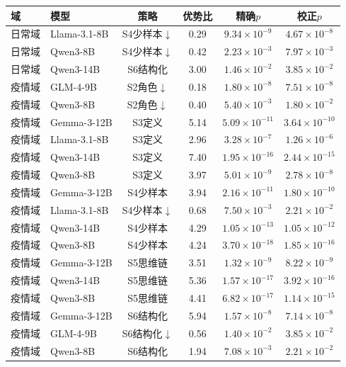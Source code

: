 \begin{tabular}{llcccc}
\toprule
域 & 模型 & 策略 & 优势比 & 精确$p$ & 校正$p$ \\
\midrule
日常域 & Llama-3.1-8B & S4少样本$\downarrow$ & 0.29 & $9.34\times 10^{-9}$ & $4.67\times 10^{-8}$ \\
日常域 & Qwen3-8B & S4少样本$\downarrow$ & 0.42 & $2.23\times 10^{-3}$ & $7.97\times 10^{-3}$ \\
日常域 & Qwen3-14B & S6结构化 & 3.00 & $1.46\times 10^{-2}$ & $3.85\times 10^{-2}$ \\
疫情域 & GLM-4-9B & S2角色$\downarrow$ & 0.18 & $1.80\times 10^{-8}$ & $7.51\times 10^{-8}$ \\
疫情域 & Qwen3-8B & S2角色$\downarrow$ & 0.40 & $5.40\times 10^{-3}$ & $1.80\times 10^{-2}$ \\
疫情域 & Gemma-3-12B & S3定义 & 5.14 & $5.09\times 10^{-11}$ & $3.64\times 10^{-10}$ \\
疫情域 & Llama-3.1-8B & S3定义 & 2.96 & $3.28\times 10^{-7}$ & $1.26\times 10^{-6}$ \\
疫情域 & Qwen3-14B & S3定义 & 7.40 & $1.95\times 10^{-16}$ & $2.44\times 10^{-15}$ \\
疫情域 & Qwen3-8B & S3定义 & 3.97 & $5.01\times 10^{-9}$ & $2.78\times 10^{-8}$ \\
疫情域 & Gemma-3-12B & S4少样本 & 3.94 & $2.16\times 10^{-11}$ & $1.80\times 10^{-10}$ \\
疫情域 & Llama-3.1-8B & S4少样本$\downarrow$ & 0.68 & $7.50\times 10^{-3}$ & $2.21\times 10^{-2}$ \\
疫情域 & Qwen3-14B & S4少样本 & 4.29 & $1.05\times 10^{-13}$ & $1.05\times 10^{-12}$ \\
疫情域 & Qwen3-8B & S4少样本 & 4.24 & $3.70\times 10^{-18}$ & $1.85\times 10^{-16}$ \\
疫情域 & Gemma-3-12B & S5思维链 & 3.51 & $1.32\times 10^{-9}$ & $8.22\times 10^{-9}$ \\
疫情域 & Qwen3-14B & S5思维链 & 5.36 & $1.57\times 10^{-17}$ & $3.92\times 10^{-16}$ \\
疫情域 & Qwen3-8B & S5思维链 & 4.41 & $6.82\times 10^{-17}$ & $1.14\times 10^{-15}$ \\
疫情域 & Gemma-3-12B & S6结构化 & 5.94 & $1.57\times 10^{-8}$ & $7.14\times 10^{-8}$ \\
疫情域 & GLM-4-9B & S6结构化$\downarrow$ & 0.56 & $1.40\times 10^{-2}$ & $3.85\times 10^{-2}$ \\
疫情域 & Qwen3-8B & S6结构化 & 1.94 & $7.08\times 10^{-3}$ & $2.21\times 10^{-2}$ \\
\bottomrule
\end{tabular}